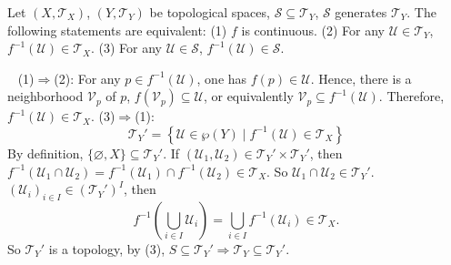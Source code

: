 \begin{propositionenv}
    Let $\left(X,\mathscr{T}_X\right)$, $\left(Y,\mathscr{T}_Y\right)$ be topological spaces, $\mathcal{S}\subseteq\mathscr{T}_Y$, $\mathcal{S}$ generates $\mathscr{T}_Y$. The following statements are equivalent:
    \newline
    (1) $f$ is continuous.
    \newline
    (2) For any $\mathcal{U}\in \mathscr{T}_Y$, $f^{-1}(\mathcal{U})\in \mathscr{T}_X$.
    \newline
    (3) For any $\mathcal{U}\in \mathcal{S}$, $f^{-1}(\mathcal{U})\in \mathcal{S}$.
\end{propositionenv}
\begin{proofenv}
    \ \newline
    (1)$\Rightarrow$(2): For any $p\in f^{-1}(\mathcal{U})$, one has $f(p)\in \mathcal{U}$. Hence, there is a neighborhood $\mathcal{V}_p$ of $p$, $f(\mathcal{V}_p)\subseteq \mathcal{U}$, or equivalently $\mathcal{V}_p\subseteq f^{-1}(\mathcal{U})$. Therefore, $f^{-1}(\mathcal{U})\in \mathscr{T}_X$.
    \newline
    (3)$\Rightarrow$(1): 
    $$\mathscr{T}_{Y}'=\left\{\mathcal{U}\in \wp(Y)\mid f^{-1}(\mathcal{U})\in\mathscr{T}_X\right\}$$
    By definition, $\{\varnothing, X\}\subseteq \mathscr{T}_{Y}'$. If $(\mathcal{U}_1,\mathcal{U}_2)\in \mathscr{T}_Y'\times\mathscr{T}_Y'$, then $f^{-1}(\mathcal{U}_1\cap \mathcal{U}_2)=f^{-1}(\mathcal{U}_1)\cap f^{-1}(\mathcal{U}_2)\in\mathscr{T}_X$. So $\mathcal{U}_1\cap \mathcal{U}_2\in \mathscr{T}_Y'$. $(\mathcal{U}_i)_{i\in I}\in\left(\mathscr{T}_{Y}'\right)^I$, then 
    $$f^{-1}\left(\bigcup_{i\in I}\mathcal{U}_i\right)=\bigcup_{i\in I}f^{-1}(\mathcal{U}_i)\in \mathscr{T}_X.$$
    So $\mathscr{T}_Y'$ is a topology, by (3), $S\subseteq \mathscr{T}_Y'\Rightarrow\mathscr{T}_Y\subseteq \mathscr{T}_Y'$.
\end{proofenv}



